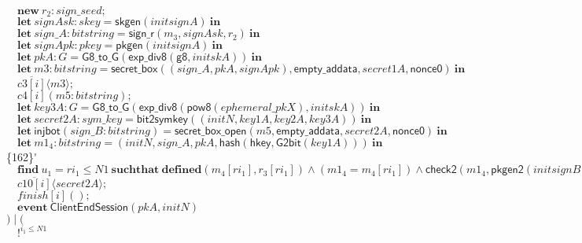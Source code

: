 \documentclass{article}
\newcommand{\cinput}[2]{{#1}({#2})}
\newcommand{\coutput}[2]{\overline{#1}\langle{#2}\rangle}
\newcommand{\kw}[1]{\mathbf{#1}}
\newcommand{\kwf}[1]{\mathsf{#1}}
\newcommand{\var}[1]{\mathit{#1}}
\newcommand{\kwt}[1]{\mathit{#1}}
\newcommand{\kwp}[1]{\mathit{#1}}
\newcommand{\kwc}[1]{\mathit{#1}}
\begin{document}
\begin{tabbing}
\>$\quad \kw{new}\ \var{r}_{2}: \kwt{sign{\_}seed};$\\
\>$\quad \kw{let}\ \var{signAsk}: \kwt{skey} = \kwf{skgen}(\var{initsignA})\ \kw{in}$\\
\>$\quad \kw{let}\ \var{sign{\_}A}: \kwt{bitstring} = \kwf{sign{\_}r}(\var{m}_{3}, \var{signAsk}, \var{r}_{2})\ \kw{in}$\\
\>$\quad \kw{let}\ \var{signApk}: \kwt{pkey} = \kwf{pkgen}(\var{initsignA})\ \kw{in}$\\
\>$\quad \kw{let}\ \var{pkA}: \kwt{G} = \kwf{G8{\_}to{\_}G}(\kwf{exp{\_}div8}(\kwf{g8}, \var{initskA}))\ \kw{in}$\\
\>$\quad \kw{let}\ \var{m3}: \kwt{bitstring} = \kwf{secret{\_}box}(\kwf{}(\var{sign{\_}A}, \var{pkA}, \var{signApk}), \kwf{empty{\_}addata}, \var{secret1A}, \kwf{nonce0})\ \kw{in}$\\
\>$\quad \coutput{\kwc{c3}[\var{i}]}{\var{m3}};$\\
\>$\quad \cinput{\kwc{c4}[\var{i}]}{\var{m5}: \kwt{bitstring}};$\\
\>$\quad \kw{let}\ \var{key3A}: \kwt{G} = \kwf{G8{\_}to{\_}G}(\kwf{exp{\_}div8}(\kwf{pow8}(\var{ephemeral{\_}pkX}), \var{initskA}))\ \kw{in}$\\
\>$\quad \kw{let}\ \var{secret2A}: \kwt{sym{\_}key} = \kwf{bit2symkey}(\kwf{}(\var{initN}, \var{key1A}, \var{key2A}, \var{key3A}))\ \kw{in}$\\
\>$\quad \kw{let}\ \kwf{injbot}(\var{sign{\_}B}: \kwt{bitstring}) = \kwf{secret{\_}box{\_}open}(\var{m5}, \kwf{empty{\_}addata}, \var{secret2A}, \kwf{nonce0})\ \kw{in}$\\
\>$\quad \kw{let}\ \var{m1}_{4}: \kwt{bitstring} = \kwf{}(\var{initN}, \var{sign{\_}A}, \var{pkA}, \kwf{hash}(\kwf{hkey}, \kwf{G2bit}(\var{key1A})))\ \kw{in}$\\
\>\{162\}\'$\quad \kw{find}\ \var{u}_{1} = \var{ri}_{1} \leq \kwp{N1}\ \kw{suchthat}\ \kw{defined}(\var{m}_{4}[\var{ri}_{1}], \var{r}_{3}[\var{ri}_{1}])\wedge (\var{m1}_{4}  =  \var{m}_{4}[\var{ri}_{1}]) \wedge  \kwf{check2}(\var{m1}_{4}, \kwf{pkgen2}(\var{initsignB}), \var{sign{\_}B})\ \kw{then}$\\
\>$\quad \coutput{\kwc{c10}[\var{i}]}{\var{secret2A}};$\\
\>$\quad \cinput{\kwc{finish}[\var{i}]}{};$\\
\>$\quad \kw{event}\ \kwf{ClientEndSession}(\var{pkA}, \var{initN})$\\
\>$) \mid ($\\
\>$\quad !^{\var{i}_{1} \leq \kwp{N1}}$\\

\end{tabbing}
\end{document}
